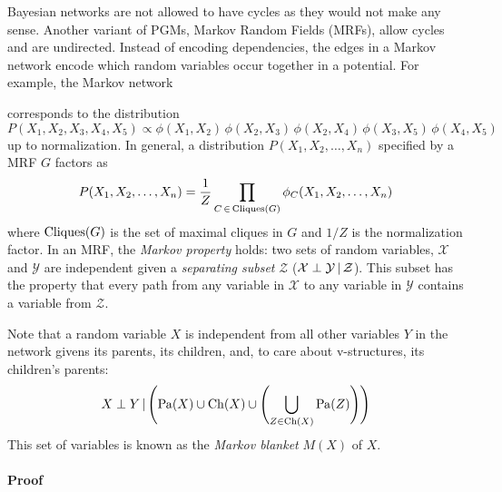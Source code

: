 	Bayesian networks are not allowed to have cycles as they would not make any sense. Another variant of PGMs, Markov Random Fields (MRFs), allow cycles and are undirected. Instead of encoding dependencies, the edges in a Markov network encode which random variables occur together in a potential. For example, the Markov network
	\begin{center}
	\end{center}
	corresponds to the distribution
	\begin{equation}
		P(X_1, X_2, X_3, X_4, X_5) \propto \phi(X_1, X_2) \, \phi(X_2, X_3) \, \phi(X_2, X_4) \, \phi(X_3, X_5) \, \phi(X_4, X_5)
	\end{equation}
	up to normalization. In general, a distribution \( P(X_1, X_2, \dots, X_n) \) specified by a MRF \(G\) factors as
	\begin{equation}
		P(X_1, X_2, \dots, X_n) = \frac{1}{Z} \prod_{C \,\in\, \operatorname{Cliques}(G)} \phi_C(X_1, X_2, \dots, X_n)
	\end{equation}
	where \( \operatorname{Cliques}(G) \) is the set of maximal cliques in \(G\) and \(1/Z\) is the normalization factor. In an MRF, the \emph{Markov property} holds: two sets of random variables, \(\mathcal{X}\) and \(\mathcal{Y}\) are independent given a \emph{separating subset} \(\mathcal{Z}\) (\( \mathcal{X} \perp \mathcal{Y} \,\vert\, \mathcal{Z} \)). This subset has the property that every path from any variable in \(\mathcal{X}\) to any variable in \(\mathcal{Y}\) contains a variable from \(\mathcal{Z}\).

	Note that a random variable \(X\) is independent from all other variables \(Y\) in the network givens its parents, its children, and, to care about v-structures, its children's parents:
	\begin{equation}
		X \perp Y \,\vert\, \Biggl( \operatorname{Pa}(X) \cup \operatorname{Ch}(X) \cup \Biggl( \bigcup_{Z \in \operatorname{Ch}(X)} \operatorname{Pa}(Z) \Biggr) \Biggr)
	\end{equation}
	This set of variables is known as the \emph{Markov blanket} \(M(X)\) of \(X\).

	\paragraph{Proof}

